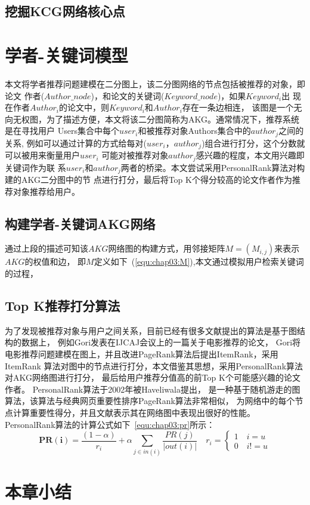 \subsection{挖掘KCG网络核心点}



\section{学者-关键词模型}

本文将学者推荐问题建模在二分图上，该二分图网络的节点包括被推荐的对象，即论文%
作者($Author\_node$)，和论文的关键词($Keyword\_node$)，如果$Keyword_i$出%
现在作者$Author_i$的论文中，则$Keyword_i$和$Author_i$存在一条边相连，%
该图是一个无向无权图，为了描述方便，本文将该二分图简称为AKG。通常情况下，推荐系统是在寻找用户%
Users集合中每个$user_i$和被推荐对象Authors集合中的$author_j$之间的关系,%
例如可以通过计算的方式给每对($user_i$，$author_j$)组合进行打分，这个分数就可以被用来衡量用户$user_i$%
可能对被推荐对象$author_j$感兴趣的程度，本文用兴趣即关键词作为联%
系$user_i$和$author_j$两者的桥梁。本文尝试采用PersonalRank算法对构建的AKG二分图中的节
点进行打分，最后将Top K个得分较高的论文作者作为推荐对象推荐给用户。%

\subsection{构建学者-关键词AKG网络}
通过上段的描述可知该$AKG$网络图的构建方式，用邻接矩阵$M=(M_{i,j})$来表示$AKG$的权值和边，%
即$M$定义如下~(\ref{equ:chap03:M}),本文通过模拟用户检索关键词的过程，%

\subsection{Top K推荐打分算法}
为了发现被推荐对象与用户之间关系，目前已经有很多文献提出的算法是基于图结构的数据上，%
例如Gori发表在IJCAJ会议上的一篇关于电影推荐的论文，%
Gori将电影推荐问题建模在图上，并且改进PageRank算法后提出ItemRank，采用ItemRank%
算法对图中的节点进行打分，本文借鉴其思想，采用PersonalRank算法对AKG网络图进行打分，%
最后给用户推荐分值高的前Top K个可能感兴趣的论文作者。%
PersonalRank算法于2002年被Haveliwala提出，%
是一种基于随机游走的图算法，该算法与经典网页重要性排序PageRank算法非常相似，%
为网络中的每个节点计算重要性得分，并且文献表示其在网络图中表现出很好的性能。%
PersonalRank算法的计算公式如下~\ref{equ:chap03:pr}所示：
\begin{equation}
\label{equ:chap03:pr}
  \mathbf{PR(i)}=\frac{(1-\alpha)}{r_i}+\alpha\sum_{j\in
  in(i)}\frac{PR(j)}{|out(i)|}\quad
   r_i =
  \begin{cases}
   1\quad i=u \\
   0\quad i!=u
  \end{cases}
\end{equation}
\section{本章小结}



